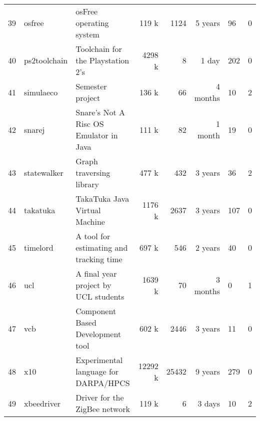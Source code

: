 \begin{table*}[htb]
\begin{tabularx}{\textwidth}{|r|l|l|r|r|r|Y|Y|}
  39 & osfree & osFree operating system & 119 k & 1124 & 5 years &  96 &   0 \\ 
  40 & ps2toolchain & Toolchain for the Playstation 2's & 4298 k &   8 & 1 day & 202 &   0 \\ 
  41 & simulaeco & Semester project & 136 k &  66 & 4 months &  10 &   2 \\ 
  42 & snarej & Snare's Not A Risc OS Emulator in Java & 111 k &  82 & 1 month &  19 &   0 \\ 
  43 & statewalker & Graph traversing library & 477 k & 432 & 3 years &  36 &   2 \\ 
  44 & takatuka & TakaTuka Java Virtual Machine & 1176 k & 2637 & 3 years & 107 &   0 \\ 
  45 & timelord & A tool for estimating and tracking time & 697 k & 546 & 2 years &  40 &   0 \\ 
  46 & ucl & A final year project by UCL students & 1639 k &  70 & 3 months &   0 &   1 \\ 
  47 & vcb & Component Based Development tool & 602 k & 2446 & 3 years &  11 &   0 \\ 
  48 & x10 & Experimental language for DARPA/HPCS & 12292 k & 25432 & 9 years & 279 &   0 \\ 
  49 & xbeedriver & Driver for the ZigBee network & 119 k &   6 & 3 days &  10 &   2 \\ 
   \hline
\end{tabularx}
\end{table*}
